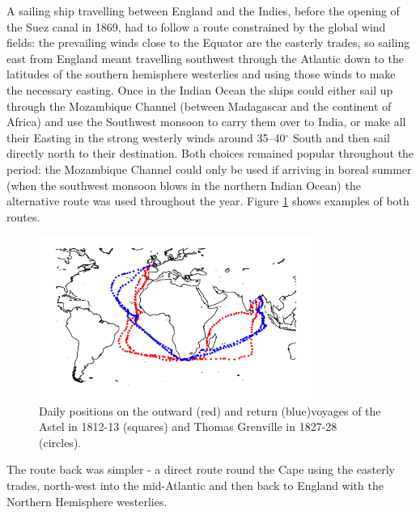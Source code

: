 \documentclass[CP]{copernicus}
\begin{document}
A sailing ship travelling between England and the Indies, before the opening of the Suez canal in 1869, had to follow a route constrained by the global wind fields: the prevailing winds close to the Equator are the easterly trades, so sailing east from England meant travelling southwest through the Atlantic down to the latitudes of the southern hemisphere westerlies and using those winds to make the necessary easting. Once in the Indian Ocean the ships could either sail up through the Mozambique Channel (between Madagascar and the continent of Africa) and use the Southwest monsoon to carry them over to India, or make all their Easting in the strong westerly winds around 35--40$^\circ$ South and then sail directly north to their destination. Both choices remained popular throughout the period: the Mozambique Channel could only be used if arriving in boreal summer (when the southwest monsoon blows in the northern Indian Ocean) the alternative route was used throughout the year. Figure \ref{Fsroc2} shows examples of both routes.
\begin{figure}[!hbp]
\begin{center}
\includegraphics[angle=0, width=0.8\textwidth]{../figures/TG+A_routes.pdf}
\caption{Daily positions on the outward (red) and return (blue)voyages of the Astel in 1812-13 (squares) and Thomas Grenville in 1827-28 (circles).}
\label{Fsroc2}
\end{center}
\end{figure}
The route back was simpler - a direct route round the Cape using the easterly trades, north-west into the mid-Atlantic and then back to England with the Northern Hemisphere westerlies.
\end{document}
